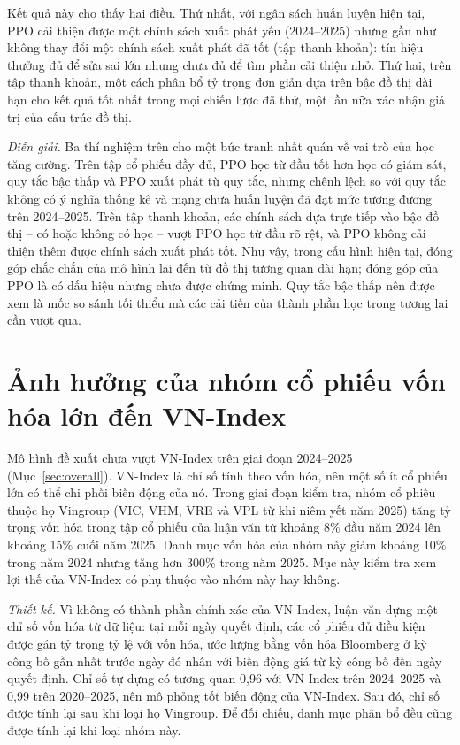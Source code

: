 Kết quả này cho thấy hai điều. Thứ nhất, với ngân sách huấn luyện hiện tại, PPO cải thiện được một chính sách xuất phát yếu (2024--2025) nhưng gần như không thay đổi một chính sách xuất phát đã tốt (tập thanh khoản): tín hiệu thưởng đủ để sửa sai lớn nhưng chưa đủ để tìm phần cải thiện nhỏ. Thứ hai, trên tập thanh khoản, một cách phân bổ tỷ trọng đơn giản dựa trên bậc đồ thị dài hạn cho kết quả tốt nhất trong mọi chiến lược đã thử, một lần nữa xác nhận giá trị của cấu trúc đồ thị.

\textit{Diễn giải.} Ba thí nghiệm trên cho một bức tranh nhất quán về vai trò của học tăng cường. Trên tập cổ phiếu đầy đủ, PPO học từ đầu tốt hơn học có giám sát, quy tắc bậc thấp và PPO xuất phát từ quy tắc, nhưng chênh lệch so với quy tắc không có ý nghĩa thống kê và mạng chưa huấn luyện đã đạt mức tương đương trên 2024--2025. Trên tập thanh khoản, các chính sách dựa trực tiếp vào bậc đồ thị -- có hoặc không có học -- vượt PPO học từ đầu rõ rệt, và PPO không cải thiện thêm được chính sách xuất phát tốt. Như vậy, trong cấu hình hiện tại, đóng góp chắc chắn của mô hình lai đến từ đồ thị tương quan dài hạn; đóng góp của PPO là có dấu hiệu nhưng chưa được chứng minh. Quy tắc bậc thấp nên được xem là mốc so sánh tối thiểu mà các cải tiến của thành phần học trong tương lai cần vượt qua.

\section{Ảnh hưởng của nhóm cổ phiếu vốn hóa lớn đến VN-Index}
\label{sec:vingroup}

Mô hình đề xuất chưa vượt VN-Index trên giai đoạn 2024--2025 (Mục~\ref{sec:overall}). VN-Index là chỉ số tính theo vốn hóa, nên một số ít cổ phiếu lớn có thể chi phối biến động của nó. Trong giai đoạn kiểm tra, nhóm cổ phiếu thuộc họ Vingroup (VIC, VHM, VRE và VPL từ khi niêm yết năm 2025) tăng tỷ trọng vốn hóa trong tập cổ phiếu của luận văn từ khoảng 8\% đầu năm 2024 lên khoảng 15\% cuối năm 2025. Danh mục vốn hóa của nhóm này giảm khoảng 10\% trong năm 2024 nhưng tăng hơn 300\% trong năm 2025. Mục này kiểm tra xem lợi thế của VN-Index có phụ thuộc vào nhóm này hay không.

\textit{Thiết kế.} Vì không có thành phần chính xác của VN-Index, luận văn dựng một chỉ số vốn hóa từ dữ liệu: tại mỗi ngày quyết định, các cổ phiếu đủ điều kiện được gán tỷ trọng tỷ lệ với vốn hóa, ước lượng bằng vốn hóa Bloomberg ở kỳ công bố gần nhất trước ngày đó nhân với biến động giá từ kỳ công bố đến ngày quyết định. Chỉ số tự dựng có tương quan 0,96 với VN-Index trên 2024--2025 và 0,99 trên 2020--2025, nên mô phỏng tốt biến động của VN-Index. Sau đó, chỉ số được tính lại sau khi loại họ Vingroup. Để đối chiếu, danh mục phân bổ đều cũng được tính lại khi loại nhóm này.

